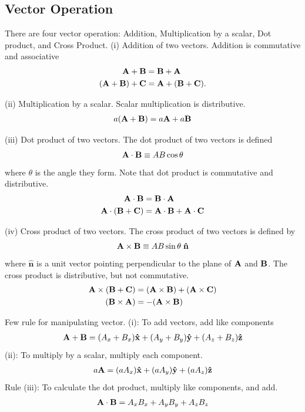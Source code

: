 \documentclass[../main.tex]{subfiles}
\begin{document}
\subsection{Vector Operation}
There are four vector operation: Addition,  Multiplication by a scalar, Dot product, and Cross Product.
(i) Addition of two vectors. Addition is commutative and associative
\begin{align*}
    \mathbf{A}+\mathbf{B}&=\mathbf{B}+\mathbf{A}\\
    (\mathbf{A }+ \mathbf{B}) +\mathbf{ C}& = \mathbf{A }+ (\mathbf{B} + \mathbf{C}).
\end{align*}

(ii) Multiplication by a scalar. Scalar multiplication is distributive.
\begin{align*}
    a(\mathbf{A} + \mathbf{\mathbf{B}}) = a\mathbf{A} + a\mathbf{B}
\end{align*}

(iii) Dot product of two vectors. The dot product of two vectors is defined 
\begin{align*}
    \mathbf{A} \cdot \mathbf{B} \equiv AB \cos \theta
\end{align*}
where $\theta$ is the angle they form. Note that dot product is commutative and distributive.
\begin{align*}
    \mathbf{A} \cdot \mathbf{B} &= \mathbf{B} \cdot \mathbf{A}\\
    \mathbf{A} \cdot (\mathbf{B} + \mathbf{C}) &= \mathbf{A} \cdot \mathbf{B} + \mathbf{A} \cdot \mathbf{C}
\end{align*}

(iv) Cross product of two vectors. The cross product of two vectors is defined by
\begin{align*}
    \mathbf{A} \times \mathbf{B} \equiv AB \sin \theta\;\mathbf{ \hat{n}}
\end{align*}
where $\mathbf{\hat{n}}$ is a unit vector pointing perpendicular to the plane of $\mathbf{A}$ and $\mathbf{B}$.  The cross product is distributive, but not commutative.
\begin{align*}
    \mathbf{A} \times (\mathbf{B} + \mathbf{C}) &= (\mathbf{A} \times \mathbf{B}) + (\mathbf{A} \times \mathbf{C})\\
    (\mathbf{B} \times \mathbf{A}) &= -(\mathbf{A} \times \mathbf{B})
\end{align*}

Few rule for manipulating vector. (i): To add vectors, add like components
\begin{align*}
    \mathbf{A} + \mathbf{B}=(A_x + B_x )\mathbf{\hat{x}} + (A_y + B_y )\mathbf{\hat{y}} + (A_z + B_z )\mathbf{\hat{z}}
\end{align*}
(ii): To multiply by a scalar, multiply each component.
\begin{align*}
    a\mathbf{A} = (a A_x )\mathbf{\hat{x}}+ (a A_y )\mathbf{\hat{y}} + (a A_z )\mathbf{\hat{z}}
\end{align*}
Rule (iii): To calculate the dot product, multiply like components, and add.
\begin{align*}
    \mathbf{A} \cdot \mathbf{B} &= A_xB_x +A_yB_y+ A_zB_z \\
\end{align*}
\end{document}
